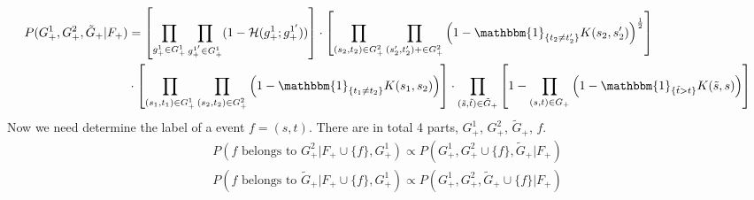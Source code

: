 \documentclass[12pt]{article}
\begin{document}
\begin{align*}
P(G_+^1, G_+^2, \tilde{G}_+ | F_+) &= \left[ \prod_{g^1_+ \in G^1_+} \prod_{g^{1'}_+ \in G^1_+} ( 1- \mH (g_+^1 ; g^{1'}_+) ) \right] \cdot \left[ \prod_{(s_2, t_2) \in G^2_+} \prod_{(s'_2, t'_2)+ \in G^2_+} \left( 1- \mathbbm{1}_{\{ t_2 \neq t'_2 \}} K(s_2, s'_2) \right)^{\frac{1}{2}} \right] \\
&\cdot \left[ \prod_{(s_1, t_1) \in G^1_+} \prod_{(s_2, t_2) \in G^2_+} \left(1 - \mathbbm{1}_{\{ t_1 \neq t_2\}} K(s_1, s_2)\right)\right] \cdot \prod_{(\tilde{s}, \tilde{t}) \in \tilde{G}_+} \left[ 1 - \prod_{(s, t) \in G_+}  \left(1 - \mathbbm{1}_{\{ \tilde{t} > t \} } K(\tilde{s}, s)\right) \right]
\end{align*}
Now we need determine the label of a event $f = (s, t)$. There are in total 4 parts, $G_+^1$, $G_+^2$, $\tilde{G}_+$, $f$. 
\begin{align}
P(f \text{ belongs to }G_+^2 | F_+ \cup \{f\}, G_+^1) \propto  P(G_+^1, G_+^2 \cup \{f\}, \tilde{G}_+ | F_+)\\
P(f \text{ belongs to }\tilde{G}_+ | F_+ \cup \{f\}, G_+^1) \propto P(G_+^1, G_+^2, \tilde{G}_+ \cup \{f\}| F_+)
\end{align}
\end{document}
